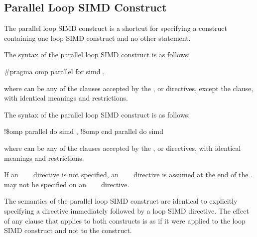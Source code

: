 \subsection{Parallel Loop SIMD Construct}
\label{subsec:Parallel Loop SIMD Construct}
\summary
The parallel loop SIMD construct is a shortcut for specifying a  construct 
containing one loop SIMD construct and no other statement.

\begin{samepage}
\syntax
\ccppspecificstart
The syntax of the parallel loop SIMD construct is as follows:

\begin{boxedcode}
\#pragma omp parallel for simd \plc{[clause[ [},\plc{] clause] ... ] new-line}
\end{boxedcode}

where  can be any of the clauses accepted by the ,  or  
directives, except the  clause, with identical meanings and restrictions.
\ccppspecificend
\end{samepage}

\begin{samepage}
\fortranspecificstart
The syntax of the parallel loop SIMD construct is as follows:

\begin{boxedcode}
!\$omp parallel do simd \plc{[clause[ [},\plc{] clause] ... ]}
!\$omp end parallel do simd
\end{boxedcode}
\end{samepage}

where  can be any of the clauses accepted by the ,  or  
directives, with identical meanings and restrictions.

\begin{samepage}
If an ~~~ directive is not specified, an 
~~~ directive is assumed at the end of the 
.  may not be specified on 
an ~~~ directive.
\fortranspecificend
\end{samepage}

\descr
The semantics of the parallel loop SIMD construct are identical to explicitly specifying 
a  directive immediately followed by a loop SIMD directive. The effect of 
any clause that applies to both constructs is as if it were applied to the loop SIMD 
construct and not to the  construct.


